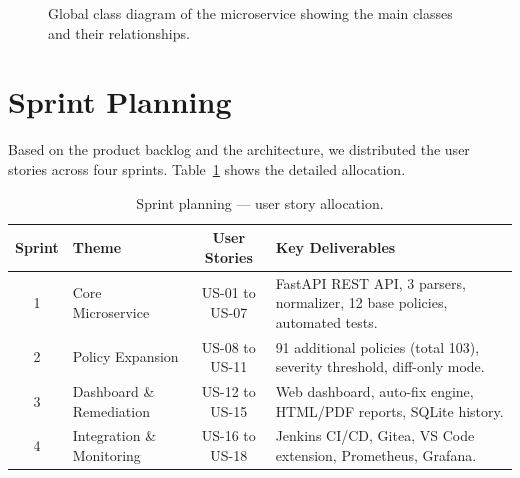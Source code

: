 \begin{figure}[H]
\caption{Global class diagram of the microservice showing the main classes and their relationships.}
\label{fig:class-diagram}
\end{figure}


\section{Sprint Planning}
\label{sec:sprint-planning}

Based on the product backlog and the architecture, we distributed the user stories across four sprints. Table~\ref{tab:sprint-planning} shows the detailed allocation.

\begin{table}[H]
\centering
\begin{tabularx}{\textwidth}{|c|X|c|X|}
\hline
\textbf{Sprint} & \textbf{Theme} & \textbf{User Stories} & \textbf{Key Deliverables} \\
\hline
1 & Core Microservice & US-01 to US-07 & FastAPI REST API, 3 parsers, normalizer, 12 base policies, automated tests. \\
\hline
2 & Policy Expansion & US-08 to US-11 & 91 additional policies (total 103), severity threshold, diff-only mode. \\
\hline
3 & Dashboard \& Remediation & US-12 to US-15 & Web dashboard, auto-fix engine, HTML/PDF reports, SQLite history. \\
\hline
4 & Integration \& Monitoring & US-16 to US-18 & Jenkins CI/CD, Gitea, VS Code extension, Prometheus, Grafana. \\
\hline
\end{tabularx}
\caption{Sprint planning --- user story allocation.}
\label{tab:sprint-planning}
\end{table}


